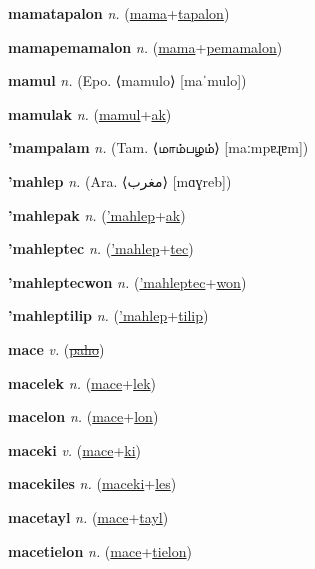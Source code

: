 \textbf{\hypertarget{mamatapalon}{mamatapalon}} \textit{n.} (\hyperlink{mama}{mama}+\allowbreak \hyperlink{tapalon}{tapalon})


\textbf{\hypertarget{mamapemamalon}{mamapemamalon}} \textit{n.} (\hyperlink{mama}{mama}+\allowbreak \hyperlink{pemamalon}{pemamalon})


\textbf{\hypertarget{mamul}{mamul}} \textit{n.} (Epo. ⟨mamulo⟩ [maˈmulo])


\textbf{\hypertarget{mamulak}{mamulak}} \textit{n.} (\hyperlink{mamul}{mamul}+\allowbreak \hyperlink{ak}{ak})


\textbf{\hypertarget{'mampalam}{'mampalam}} \textit{n.} (Tam. ⟨{\tamil{}மாம்பழம்}⟩ [maːmpɐɻɐm])


\textbf{\hypertarget{'mahlep}{'mahlep}} \textit{n.} (Ara. ⟨{\arabics{}مغرب‎}⟩ [mɑɣreb])


\textbf{\hypertarget{'mahlepak}{'mahlepak}} \textit{n.} (\hyperlink{'mahlep}{'mahlep}+\allowbreak \hyperlink{ak}{ak})


\textbf{\hypertarget{'mahleptec}{'mahleptec}} \textit{n.} (\hyperlink{'mahlep}{'mahlep}+\allowbreak \hyperlink{tec}{tec})


\textbf{\hypertarget{'mahleptecwon}{'mahleptecwon}} \textit{n.} (\hyperlink{'mahleptec}{'mahleptec}+\allowbreak \hyperlink{won}{won})


\textbf{\hypertarget{'mahleptilip}{'mahleptilip}} \textit{n.} (\hyperlink{'mahlep}{'mahlep}+\allowbreak \hyperlink{tilip}{tilip})


\textbf{\hypertarget{mace}{mace}} \textit{v.} (\hyperlink{paho}{\sout{paho}})


\textbf{\hypertarget{macelek}{macelek}} \textit{n.} (\hyperlink{mace}{mace}+\allowbreak \hyperlink{lek}{lek})


\textbf{\hypertarget{macelon}{macelon}} \textit{n.} (\hyperlink{mace}{mace}+\allowbreak \hyperlink{lon}{lon})


\textbf{\hypertarget{maceki}{maceki}} \textit{v.} (\hyperlink{mace}{mace}+\allowbreak \hyperlink{ki}{ki})


\textbf{\hypertarget{macekiles}{macekiles}} \textit{n.} (\hyperlink{maceki}{maceki}+\allowbreak \hyperlink{les}{les})


\textbf{\hypertarget{macetayl}{macetayl}} \textit{n.} (\hyperlink{mace}{mace}+\allowbreak \hyperlink{tayl}{tayl})


\textbf{\hypertarget{macetielon}{macetielon}} \textit{n.} (\hyperlink{mace}{mace}+\allowbreak \hyperlink{tielon}{tielon})


